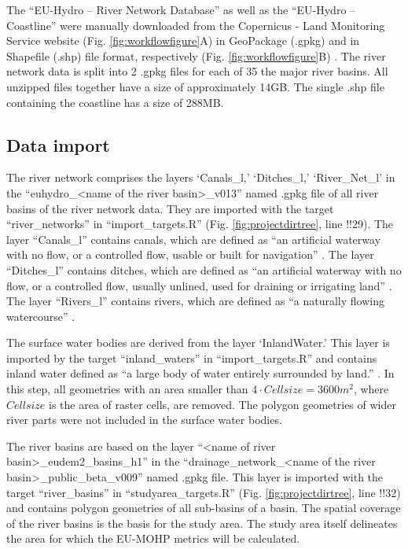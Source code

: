 \documentclass[fleqn,10pt]{wlscirep}
\begin{document}
The ``EU-Hydro -- River Network Database'' as well as the ``EU-Hydro -- Coastline'' were manually downloaded from the Copernicus - Land Monitoring Service website (Fig. \ref{fig:workflowfigure}A) in GeoPackage (.gpkg) and in Shapefile (.shp) file format, respectively (Fig. \ref{fig:workflowfigure}B) \cite{noauthor_eu-hydro_2021, noauthor_eu-hydro_2021}. The river network data is split into 2 .gpkg files for each of 35 the major river basins. All unzipped files together have a size of approximately 14GB. The single .shp file containing the coastline has a size of 288MB.

\hypertarget{data-import}{%
\subsection*{Data import}\label{data-import}}

The river network comprises the layers `Canals\_l,' `Ditches\_l,' `River\_Net\_l' in the ``euhydro\_\textless name of the river basin\textgreater\_v013'' named .gpkg file of all river basins of the river network data. They are imported with the target ``river\_networks'' in ``import\_targets.R'' (Fig. \ref{fig:projectdirtree}, line !!29). The layer ``Canals\_l'' contains canals, which are defined as ``an artificial waterway with no flow, or a controlled flow, usable or built for navigation'' \cite{gallaun_eu-hydro_2019}. The layer ``Ditches\_l'' contains ditches, which are defined as ``an artificial waterway with no flow, or a controlled flow, usually unlined, used for draining or irrigating land'' \cite{gallaun_eu-hydro_2019}. The layer ``Rivers\_l'' contains rivers, which are defined as ``a naturally flowing watercourse'' \cite{gallaun_eu-hydro_2019}.

The surface water bodies are derived from the layer `InlandWater.' This layer is imported by the target ``inland\_waters'' in ``import\_targets.R'' and contains inland water defined as ``a large body of water entirely surrounded by land.'' \cite{gallaun_eu-hydro_2019}. In this step, all geometries with an area smaller than \(4 \cdot Cellsize = 3600m^2\), where \(Cellsize\) is the area of raster cells, are removed. The polygon geometries of wider river parts were not included in the surface water bodies.

The river basins are based on the layer ``\textless name of river basin\textgreater\_eudem2\_basins\_h1'' in the ``drainage\_network\_\textless name of the river basin\textgreater\_public\_beta\_v009'' named .gpkg file. This layer is imported with the target ``river\_basins'' in ``studyarea\_targets.R'' (Fig. \ref{fig:projectdirtree}, line !!32) and contains polygon geometries of all sub-basins of a basin. The spatial coverage of the river basins is the basis for the study area. The study area itself delineates the area for which the EU-MOHP metrics will be calculated.
\end{document}
